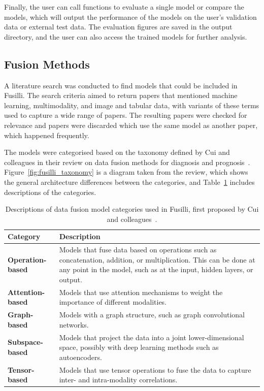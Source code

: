 Finally, the user can call functions to evaluate a single model or compare the models, which will output the performance of the models on the user's validation data or external test data.
The evaluation figures are saved in the output directory, and the user can also access the trained models for further analysis.

\subsection{Fusion Methods}

A literature search was conducted to find models that could be included in Fusilli.
The search criteria aimed to return papers that mentioned machine learning, multimodality, and image and tabular data, with variants of these terms used to capture a wide range of papers.
The resulting papers were checked for relevance and papers were discarded which use the same model as another paper, which happened frequently.

The models were categorised based on the taxonomy defined by Cui and colleagues in their review on data fusion methods for diagnosis and prognosis~\cite{cuiDeepMultimodalFusion2022}.
Figure~\ref{fig:fusilli_taxonomy} is a diagram taken from the review, which shows the general architecture differences between the categories, and Table~\ref{tab:fusilli_taxonomy} includes descriptions of the categories.

\begin{table}
    \centering
    \caption{Descriptions of data fusion model categories used in Fusilli, first proposed by Cui and colleagues~\cite{cuiDeepMultimodalFusion2022}.}
    \label{tab:fusilli_taxonomy}
    \begin{tabular}{|p{}p{}|}
        \hline
        \textbf{Category} & \textbf{Description} \\ \hline
        \textbf{Operation-based} & Models that fuse data based on operations such as concatenation, addition, or multiplication. This can be done at any point in the model, such as at the input, hidden layers, or output. \\ \hline
        \textbf{Attention-based} & Models that use attention mechanisms to weight the importance of different modalities. \\ \hline
        \textbf{Graph-based} & Models with a graph structure, such as graph convolutional networks. \\ \hline
        \textbf{Subspace-based} & Models that project the data into a joint lower-dimensional space, possibly with deep learning methods such as autoencoders. \\ \hline
        \textbf{Tensor-based} & Models that use tensor operations to fuse the data to capture inter- and intra-modality correlations. \\ \hline
    \end{tabular}
\end{table}


